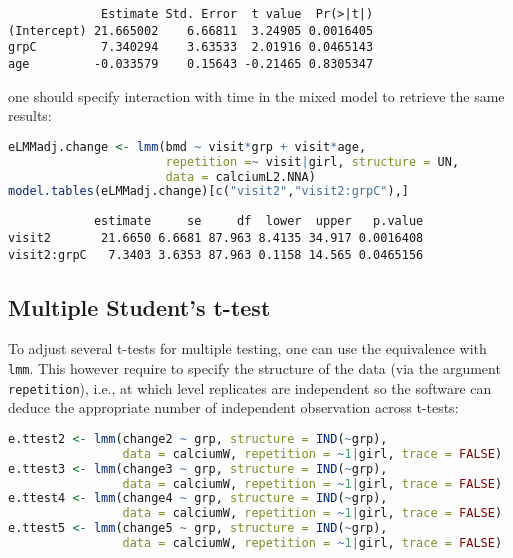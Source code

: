 \documentclass[12pt]{article}
\begin{document}
\label{}
\begin{verbatim}
             Estimate Std. Error  t value  Pr(>|t|)
(Intercept) 21.665002    6.66811  3.24905 0.0016405
grpC         7.340294    3.63533  2.01916 0.0465143
age         -0.033579    0.15643 -0.21465 0.8305347
\end{verbatim}


one should specify interaction with time in the mixed model to
retrieve the same results:
\begin{lstlisting}[language=r,numbers=none]
eLMMadj.change <- lmm(bmd ~ visit*grp + visit*age,
                      repetition =~ visit|girl, structure = UN,
                      data = calciumL2.NNA)
model.tables(eLMMadj.change)[c("visit2","visit2:grpC"),]
\end{lstlisting}

\label{}
\begin{verbatim}
            estimate     se     df  lower  upper   p.value
visit2       21.6650 6.6681 87.963 8.4135 34.917 0.0016408
visit2:grpC   7.3403 3.6353 87.963 0.1158 14.565 0.0465156
\end{verbatim}



\clearpage
\subsection{Multiple Student's t-test}
\label{sec:org0fecb3c}

To adjust several t-tests for multiple testing, one can use the
equivalence with \texttt{lmm}. This however require to specify the structure
of the data (via the argument \texttt{repetition}), i.e., at which level
replicates are independent so the software can deduce the appropriate
number of independent observation across t-tests:

\begin{lstlisting}[language=r,numbers=none]
e.ttest2 <- lmm(change2 ~ grp, structure = IND(~grp), 
                data = calciumW, repetition = ~1|girl, trace = FALSE)
e.ttest3 <- lmm(change3 ~ grp, structure = IND(~grp), 
                data = calciumW, repetition = ~1|girl, trace = FALSE)
e.ttest4 <- lmm(change4 ~ grp, structure = IND(~grp), 
                data = calciumW, repetition = ~1|girl, trace = FALSE)
e.ttest5 <- lmm(change5 ~ grp, structure = IND(~grp), 
                data = calciumW, repetition = ~1|girl, trace = FALSE)
\end{lstlisting}
\end{document}
